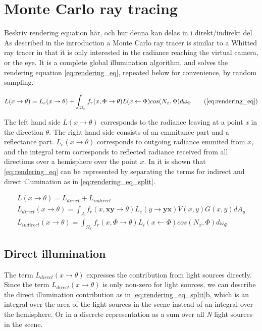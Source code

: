 \documentclass[]{report}   %
\begin{document}
\section{Monte Carlo ray tracing}
Beskriv rendering equation här, och hur denna kan delas in i direkt/indirekt del
As described in the introduction a Monte Carlo ray tracer is similar to a Whitted ray tracer in that it is only interested in the radiance reaching the virtual camera, or the eye.
It is a complete global illumination algorithm, and solves the rendering equation \autoref{eq:rendering_eq}, repeated below for convenience, by random sampling.

\begin{equation}
L(x \rightarrow \theta) = L_e(x \rightarrow \theta) + \int_{\Omega_x} f_r(x, \Phi \rightarrow \theta)L(x \leftarrow \Phi)cos(N_x, \Phi)d\omega_{\Phi}
\tag{\ref{eq:rendering_eq}}
\end{equation}

The left hand side $L(x \rightarrow \theta)$ corresponds to the radiance leaving at a point \emph{x} in the direction $\theta$.
The right hand side consists of an emmitance part and a reflectance part.
$ L_e(x \rightarrow \theta)$ corresponds to outgoing radiance emmited from $x$, and the integral term corresponds to reflected radiance received from all directions over a hemisphere over the point $x$.
In \cite{dutre} it is shown that \autoref{eq:rendering_eq} can be represented by separating the terms for indirect and direct illumination as in \autoref{eq:rendering_eq_split}.


\begin{subequations} \label{eq:rendering_eq_split}
\begin{align} 
L(x \rightarrow \theta) = L_{direct}+L_{indirect} \\
L_{direct}(x \rightarrow \theta) = \int_A f_r(x, \mathbf{xy}\rightarrow \theta) L_e(y \rightarrow \mathbf{yx})V(x,y)G(x,y)dA_y \\
L_{indirect}(x \rightarrow \theta) = \int_{\Omega_x}  f_r(x, \Phi \rightarrow \theta) L_i(x \leftarrow \Phi)cos(N_x, \Phi)d\omega_{\Phi}
\end{align}
\end{subequations}

\subsection{Direct illumination}
The term $L_{direct}(x \rightarrow \theta)$ expresses the contribution from light sources directly.
Since the term $L_{direct}(x \rightarrow \theta)$ is only non-zero for light sources, we can describe the direct illumination contribution as in \autoref{eq:rendering_eq_split}b, which is an integral over the area of the light sources in the scene instead of an integral over the hemisphere.
Or in a discrete representation as a sum over all \emph{N} light sources in the scene.
\end{document}
